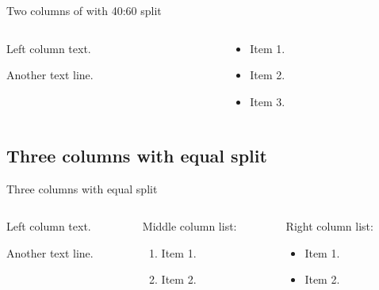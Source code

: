 \documentclass[
  11pt,
  aspectratio=169]{beamer}
\providecommand{\tightlist}{%
  \setlength{\itemsep}{0pt}\setlength{\parskip}{0pt}}
\begin{document}
\begin{frame}{Two columns of with 40:60 split}
\begin{columns}[T]
\begin{column}{0.4\linewidth}
Left column text.

Another text line.
\end{column}

\begin{column}{0.6\linewidth}
\begin{itemize}
\tightlist
\item
  Item 1.
\item
  Item 2.
\item
  Item 3.
\end{itemize}
\end{column}
\end{columns}
\end{frame}

\subsection{Three columns with equal
split}\label{three-columns-with-equal-split}

\begin{frame}{Three columns with equal split}
\begin{columns}[T]
\begin{column}{0.48\linewidth}
Left column text.

Another text line.
\end{column}

\begin{column}{0.48\linewidth}
Middle column list:

\begin{enumerate}
\tightlist
\item
  Item 1.
\item
  Item 2.
\end{enumerate}
\end{column}

\begin{column}{0.48\linewidth}
Right column list:

\begin{itemize}
\tightlist
\item
  Item 1.
\item
  Item 2.
\end{itemize}
\end{column}
\end{columns}
\end{frame}
\end{document}
